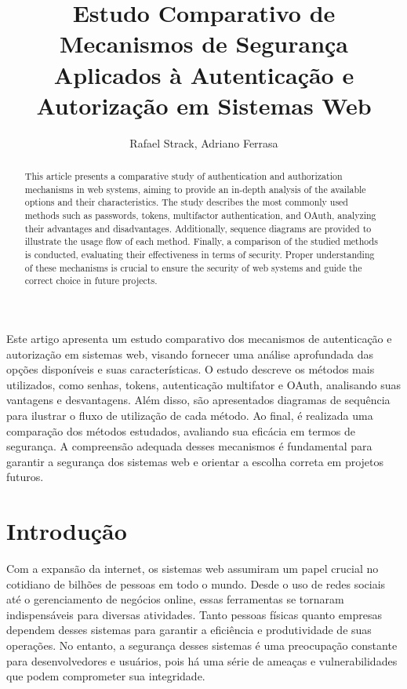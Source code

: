 \documentclass[12pt]{article}
\title{Estudo Comparativo de Mecanismos de Segurança Aplicados à Autenticação e Autorização em 
Sistemas Web}
\author{Rafael Strack\inst{1}, Adriano Ferrasa\inst{1}}
\begin{document}
\maketitle

\begin{abstract}
  This article presents a comparative study of authentication and authorization mechanisms in web
  systems, aiming to provide an in-depth analysis of the available options and their
  characteristics. The study describes the most commonly used methods such as passwords, tokens,
  multifactor authentication, and OAuth, analyzing their advantages and disadvantages. Additionally,
  sequence diagrams are provided to illustrate the usage flow of each method. Finally, a comparison
  of the studied methods is conducted, evaluating their effectiveness in terms of security. Proper
  understanding of these mechanisms is crucial to ensure the security of web systems and guide the
  correct choice in future projects.
\end{abstract}

\begin{resumo}
  Este artigo apresenta um estudo comparativo dos mecanismos de autenticação e autorização em
  sistemas web, visando fornecer uma análise aprofundada das opções disponíveis e suas
  características. O estudo descreve os métodos mais utilizados, como senhas, tokens, autenticação
  multifator e OAuth, analisando suas vantagens e desvantagens. Além disso, são apresentados
  diagramas de sequência para ilustrar o fluxo de utilização de cada método. Ao final, é
  realizada uma comparação dos métodos estudados, avaliando sua eficácia em termos de segurança. A
  compreensão adequada desses mecanismos é fundamental para garantir a segurança dos sistemas web e
  orientar a escolha correta em projetos futuros.
\end{resumo}


\section{Introdução}

Com a expansão da internet, os sistemas web assumiram um papel crucial no cotidiano de bilhões de
pessoas em todo o mundo. Desde o uso de redes sociais até o gerenciamento de negócios online, essas
ferramentas se tornaram indispensáveis para diversas atividades. Tanto pessoas físicas quanto
empresas dependem desses sistemas para garantir a eficiência e produtividade de suas operações.
No entanto, a segurança desses sistemas é uma preocupação constante para desenvolvedores e
usuários, pois há uma série de ameaças e vulnerabilidades que podem comprometer sua integridade.
\end{document}
